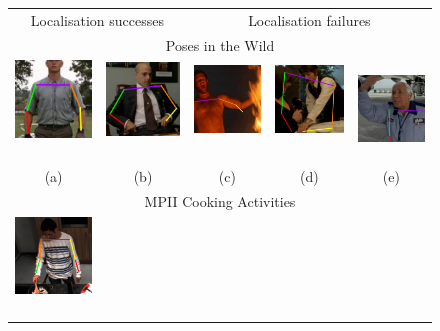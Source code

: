 \documentclass[runningheads]{llncs}
\begin{document}
\begin{figure}[t]
\begin{center}
\begin{tabular}{@{}c@{}c c@{}c@{}c@{}}
\multicolumn{2}{c}{Localisation successes} &
\multicolumn{3}{c}{Localisation failures}\\[0.4em]
\multicolumn{5}{c}{Poses in the Wild}\\
\includegraphics[width=0.17\linewidth]{figures/shots-cropped/piw-s18f30-good-gump-mower.jpg}\,&
\includegraphics[width=0.17\linewidth]{figures/shots-cropped/piw-s20f2-good-suit.jpg}\,&
\includegraphics[width=0.17\linewidth]{figures/shots-cropped/piw-s9f18-bad-no-wrist.jpg}\,&
\includegraphics[width=0.17\linewidth]{figures/shots-cropped/piw-s10f27-bad-pose-transfer.jpg}\,&
\includegraphics[width=0.17\linewidth]{figures/shots-cropped/piw-s13f15-bad-terminal-movement.jpg}\\
(a) & (b) & (c) & (d) & (e)\\[0.6em]
\multicolumn{5}{c}{MPII Cooking Activities}\\
\includegraphics[width=0.17\linewidth]{figures/shots-cropped/mpii-s10f54-good-white-shirt.jpg}\,&

\end{tabular}
\end{center}
\end{figure}
\end{document}
